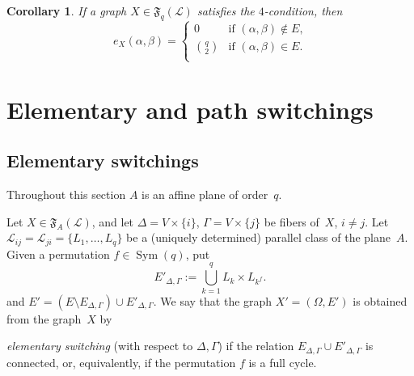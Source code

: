 \documentclass{amsart}
\newcommand{\cal}{\mathcal}
\newtheorem{corollary}[formula]{Corollary}
\def\crllrl#1{\begin{corollary}\label{#1}}
\def\ecrllr{\end{corollary}}
\def\css{\begin{cases}}
\def\ecss{\end{cases}}
\def\prf{\begin{proof}\textcolor{red}{TOPROVE 0}\end{proof}}
\def\cL{{\cal L}}
\def\fF{{\mathfrak F}}
\DeclareMathOperator{\sym}{Sym}
\begin{document}
\crllrl{060623a14}
If a graph   $X\in\fF_q(\cL)$ satisfies the $4$-condition, then 
$$
e_X(\alpha,\beta)=
\css
0 &\text{if $(\alpha,\beta)\not \in E$,}\\
\binom{q}{2} &\text{if $(\alpha,\beta)\in E$.}\\
\ecss
$$
\ecrllr
\begin{comment}
\prf
Let $\alpha$ and $\beta$ be non-adjacent in $X$. By Lemma~\ref{110723a}, we have $b(\alpha,\beta)=0$. It follows that the graph $X_{N(\alpha,\beta)}$ is empty, where $N(\alpha,\beta)=N_X(\alpha,\beta)$. Thus, $e_X(\alpha,\beta)=0$. Now let $\alpha$ and $\beta$ be adjacent in $X$. Then any two vertices in the set $N(\alpha,\beta)$ must be adjacent (for otherwise $e_X(\alpha',\beta')\ne 0$ for some nonadjacent vertices $\alpha',\beta'\in N(\alpha,\beta)$). Thus, $e_X(\alpha,\beta)=\binom{q}{2}$.
\eprf
\end{comment}

\section{Elementary and path switchings}\label{290623a}


\subsection{Elementary switchings}
Throughout this section $A$ is  an affine plane of order~$q$.
  
Let $X\in \fF_A(\cL)$, and let $\Delta=V\times\{i\}$, $\Gamma=V\times\{j\}$ be fibers of~$X$, $i\ne j$.  Let $\cL_{ij}=\cL_{ji}=\{L_1,\ldots,L_q\}$ be a (uniquely determined) parallel class of the plane~$A$.  Given a permutation $f\in\sym(q)$, put 
$$
E'_{\Delta,\Gamma}:=\bigcup_{k=1}^qL_k\times L_{k^f}.
$$
and $E'=(E\setminus E^{}_{\Delta,\Gamma})\cup E'_{\Delta,\Gamma}$. We say that the graph $X'=(\Omega,E')$ is obtained from the graph~$X$ by 
\begin{comment}
{\it $f$-switching} with respect to the fibers $\Delta$ and $\Gamma$.  Certainly, any two graphs belonging to $\fF_A(\cL)$  can be obtained one from another by a suitable sequence of $f$-switchings.
An $f$-switching with respect to the fibers $\Delta$ and $\Gamma$ is said to be 
\end{comment}
{\it elementary switching} (with respect to $\Delta,\Gamma$) 
if the relation $E^{}_{\Delta,\Gamma}\cup E'_{\Delta,\Gamma}$ is connected, or, equivalently, if the permutation $f$ is a full cycle. 
\end{document}
